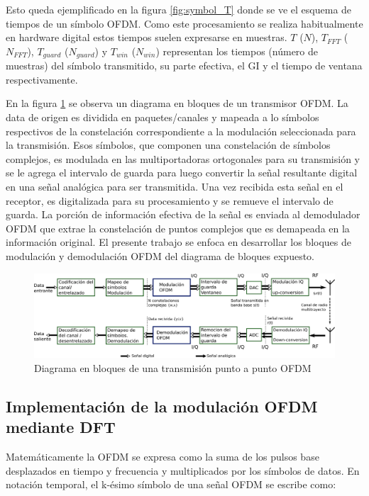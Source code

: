 Esto queda ejemplificado en la figura \ref{fig:symbol_T} donde se ve el esquema
de tiempos de un símbolo OFDM. Como este procesamiento se realiza habitualmente en
hardware digital estos tiempos suelen expresarse en muestras. $T$ ($N$),
$T_{FFT}$ ($N_{FFT}$), $T_{guard}$ ($N_{guard}$) y $T_{win}$ ($N_{win}$)
representan los tiempos (número de muestras) del símbolo transmitido, su parte
efectiva, el GI y el tiempo de ventana respectivamente.

En la figura \ref{fig:OFDM_blocks} se
observa un diagrama en bloques de un transmisor OFDM. La data de origen es dividida en paquetes/canales y mapeada a lo símbolos
respectivos de la constelación correspondiente a la modulación seleccionada para la transmisión.
Esos símbolos, que componen una constelación de símbolos complejos, es modulada en las
multiportadoras ortogonales para su transmisión y se le agrega el intervalo de guarda para luego
convertir la señal resultante digital en una señal analógica para ser transmitida. Una vez recibida
esta señal en el receptor, es digitalizada para su procesamiento y se remueve el intervalo de
guarda. La porción de información efectiva de la señal es enviada al demodulador OFDM que extrae la
constelación de puntos complejos que es demapeada en la información original.
El presente trabajo se enfoca en desarrollar los bloques de modulación y demodulación OFDM del
diagrama de bloques expuesto.


\begin{figure}[htb!]
        \centering
        \includegraphics[width=15cm]{./figures/ofdm_blocks.png}	%
        \caption{Diagrama en bloques de una transmisión punto a punto OFDM}
        \label{fig:OFDM_blocks}
\end{figure}

\subsection{Implementación de la modulación OFDM mediante DFT}

Matemáticamente la OFDM se expresa como la suma de los pulsos base desplazados
en tiempo y frecuencia y multiplicados por los símbolos de datos.
En notación temporal, el k-ésimo símbolo de una señal OFDM se escribe como:

